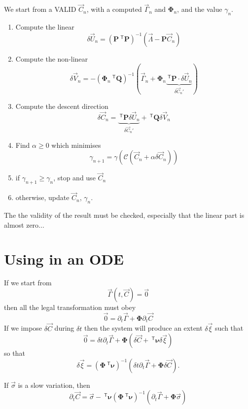 \documentclass[aps]{revtex4}
\newcommand{\mymat}[1]{\bm{#1}}
\newcommand{\mytrn}[1]{~^{\mathsf{T}}{#1}}
\begin{document}
We start from a VALID $\vec{C}_n$, with a computed $\vec{\Gamma}_n$ and $\mymat{\Phi}_n$, and
the value $\gamma_n$.

\begin{enumerate}
\item Compute the linear 
	$$\delta\vec{U}_n = \left(\mymat{P}\mytrn{\mymat{P}}\right)^{-1} \left( \vec{\Lambda} - \mymat{P} \vec{C}_n \right)$$

\item Compute the non-linear
	$$\delta\vec{V}_n = - \left(\mymat{\Phi}_n\mytrn{\mymat{Q}}\right)^{-1}\left(\vec{\Gamma}_n+\mymat{\Phi}_n\underbrace{\mytrn{\mymat{P}}\cdot\delta\vec{U}_n}_{\delta\vec{C}_n'}\right)$$

\item Compute the descent direction 
$$
	\delta\vec{C}_n = \underbrace{\mytrn{\mymat{P}} \delta \vec{U}_n}_{\delta\vec{C}_n'} + \mytrn{\mymat{Q}} \delta\vec{V}_n
$$

\item Find $\alpha\geq0$ which minimises 
$$
	\gamma_{n+1} = \gamma\left( \mathcal{C}\left(\vec{C}_n + \alpha \delta\vec{C}_n\right)\right)
$$

\item if $\gamma_{n+1}\geq\gamma_n$, stop and use $\vec{C}_n$ 
\item otherwise, update $\vec{C}_n$, $\gamma_n$.
\end{enumerate}

The the validity of the result must be checked, especially that the linear part is almost zero...

\section{Using in an ODE}

If we start from 
\begin{equation}
	\vec{\Gamma}\left(t,\vec{C}\right) = \vec{0}
\end{equation}
then all the legal transformation must obey
\begin{equation}
	\vec{0} = \partial_t \vec{\Gamma} + \mymat{\Phi} \partial_t \vec{C}
\end{equation}
If we impose $\delta\vec{C}$ during $\delta t$ then the system will produce an extent $\delta \vec{\xi}$ such that
\begin{equation}
	\vec{0} = \delta t \partial_t \vec{\Gamma} + \mymat{\Phi}\left(\delta \vec{C} + \mytrn{\mymat{\nu}} \delta \vec{\xi}\right)
\end{equation}
so that
\begin{equation}
	\delta \vec{\xi} = \left(\mymat{\Phi}\mytrn{\mymat{\nu}}\right)^{-1} \left( \delta t \partial_t \vec{\Gamma}  + \mymat{\Phi} \delta \vec{C} \right).
\end{equation}

If $\vec{\sigma}$ is a slow variation, then
\begin{equation}
	\partial_t \vec{C} = \vec{\sigma} - \mytrn{\mymat{\nu}} \left(\mymat{\Phi}\mytrn{\mymat{\nu}}\right)^{-1} \left( \partial_t \vec{\Gamma} + \mymat{\Phi} \vec{\sigma} \right)
\end{equation}
	
\end{document}
